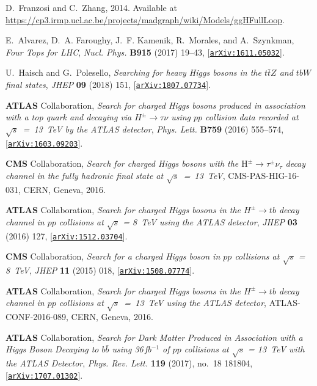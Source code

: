 \documentclass[a4paper, 11pt,notoc]{article}
\begin{document}
\begin{thebibliography}{100}
D.~Franzosi and C.~Zhang, 2014.
\newblock Available at
  \url{https://cp3.irmp.ucl.ac.be/projects/madgraph/wiki/Models/ggHFullLoop}.

E.~Alvarez, D.~A. Faroughy, J.~F. Kamenik, R.~Morales, and A.~Szynkman, {\it
  {Four Tops for LHC}},  {\em Nucl. Phys.} {\bf B915} (2017) 19--43,
  [\href{http://arxiv.org/abs/1611.05032}{{\tt arXiv:1611.05032}}].
  
U.~Haisch and G.~Polesello, {\it {Searching for heavy Higgs bosons in the $t
  \bar t Z$ and $t b W$ final states}},  {\em JHEP} {\bf 09} (2018) 151,
  [\href{http://arxiv.org/abs/1807.07734}{{\tt arXiv:1807.07734}}].  

{\bf ATLAS} Collaboration, {\it {Search for charged Higgs
  bosons produced in association with a top quark and decaying via $H^{\pm}
  \rightarrow \tau\nu$ using $pp$ collision data recorded at $\sqrt{s}$~=~13~TeV 
  by the ATLAS detector}},  {\em Phys. Lett.} {\bf B759} (2016) 555--574,
  [\href{http://arxiv.org/abs/1603.09203}{{\tt arXiv:1603.09203}}].

{\bf CMS} Collaboration, {\it {Search for charged Higgs bosons with the
  $\mathrm{H}^{\scriptscriptstyle \pm}\rightarrow \tau^{\scriptscriptstyle
  \pm}\nu_{\tau}$ decay channel in the fully hadronic final state at $\sqrt{s}$~=~13~TeV}},
    CMS-PAS-HIG-16-031, CERN, Geneva, 2016.

{\bf ATLAS} Collaboration, {\it {Search for charged Higgs bosons
  in the $H^{\pm} \rightarrow tb$ decay channel in $pp$ collisions at
  $\sqrt{s}$ = 8~TeV using the ATLAS detector}},  {\em JHEP} {\bf 03} (2016)
  127, [\href{http://arxiv.org/abs/1512.03704}{{\tt arXiv:1512.03704}}].

{\bf CMS} Collaboration, {\it {Search for a charged
  Higgs boson in $pp$ collisions at $ \sqrt{s}$ = 8~TeV}},  {\em JHEP} {\bf 11}
  (2015) 018, [\href{http://arxiv.org/abs/1508.07774}{{\tt arXiv:1508.07774}}].

{\bf ATLAS} Collaboration, {\it {Search for charged Higgs bosons in the
  $H^{\pm}\to tb$ decay channel in $pp$ collisions at $\sqrt{s}$~=~13~TeV using
  the ATLAS detector}},  ATLAS-CONF-2016-089, CERN, Geneva,
  2016.

{\bf ATLAS} Collaboration, {\it {Search for Dark Matter
  Produced in Association with a Higgs Boson Decaying to $b\bar b$ using 36$\,$fb$^{-1}$ 
  of $pp$ collisions at $\sqrt s$ = 13~TeV with the ATLAS Detector}},
  {\em Phys. Rev. Lett.} {\bf 119} (2017), no.~18 181804,
  [\href{http://arxiv.org/abs/1707.01302}{{\tt arXiv:1707.01302}}].


\end{thebibliography}
\end{document}
